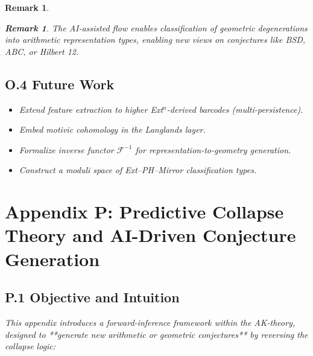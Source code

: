 \documentclass[11pt]{article}
\newtheorem{remark}[theorem]{Remark}
\begin{document}
\begin{remark}
\vspace{1em}
\begin{center}
\end{center}
\vspace{1em}

\begin{remark}
The AI-assisted flow enables classification of geometric degenerations into arithmetic representation types, enabling new views on conjectures like BSD, ABC, or Hilbert 12.
\end{remark}

\subsection*{O.4 Future Work}

\begin{itemize}
  \item Extend feature extraction to higher Ext$^n$-derived barcodes (multi-persistence).
  \item Embed motivic cohomology in the Langlands layer.
  \item Formalize inverse functor \( \mathcal{F}^{-1} \) for representation-to-geometry generation.
  \item Construct a moduli space of Ext–PH–Mirror classification types.
\end{itemize}


\section*{Appendix P: Predictive Collapse Theory and AI-Driven Conjecture Generation}

\subsection*{P.1 Objective and Intuition}

This appendix introduces a forward-inference framework within the AK-theory,  
designed to **generate new arithmetic or geometric conjectures** by reversing the collapse logic:


\end{remark}
\end{document}
